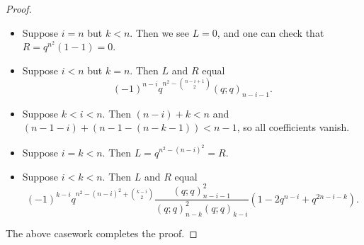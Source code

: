 \begin{proof}
\begin{itemize}
        \item Suppose $i=n$ but $k<n$. Then we see $L=0$, and one can check that $R=q^{n^2}(1-1)=0$.
        \item Suppose $i<n$ but $k=n$. Then $L$ and $R$ equal
        \[(-1)^{n-i}q^{n^2-\binom{n-i+1}2}(q;q)_{n-i-1}.\]
        \item Suppose $k<i<n$. Then $(n-i)+k<n$ and $(n-1-i)+(n-1-(n-k-1))<n-1$, so all coefficients vanish.
        \item Suppose $i=k<n$. Then $L=q^{n^2-(n-i)^2}=R$.
        \item Suppose $i<k<n$. Then $L$ and $R$ equal
        \[(-1)^{k-i}q^{n^2-(n-i)^2+\binom{k-i}2}\frac{(q;q)_{n-i-1}^2}{(q;q)_{n-k}^2(q;q)_{k-i}}\left(1-2q^{n-i}+q^{2n-i-k}\right).\]
    \end{itemize}
    The above casework completes the proof.
\end{proof}

